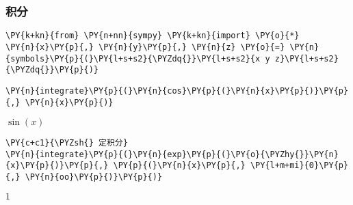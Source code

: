     \hypertarget{ux79efux5206}{%
\subsubsection{积分}\label{ux79efux5206}}

    \begin{tcolorbox}[breakable, size=fbox, boxrule=1pt, pad at break*=1mm,colback=cellbackground, colframe=cellborder]
\begin{Verbatim}[commandchars=\\\{\}]
\PY{k+kn}{from} \PY{n+nn}{sympy} \PY{k+kn}{import} \PY{o}{*}
\PY{n}{x}\PY{p}{,} \PY{n}{y}\PY{p}{,} \PY{n}{z} \PY{o}{=} \PY{n}{symbols}\PY{p}{(}\PY{l+s+s2}{\PYZdq{}}\PY{l+s+s2}{x y z}\PY{l+s+s2}{\PYZdq{}}\PY{p}{)}
\end{Verbatim}
\end{tcolorbox}

    \begin{tcolorbox}[breakable, size=fbox, boxrule=1pt, pad at break*=1mm,colback=cellbackground, colframe=cellborder]
\begin{Verbatim}[commandchars=\\\{\}]
\PY{n}{integrate}\PY{p}{(}\PY{n}{cos}\PY{p}{(}\PY{n}{x}\PY{p}{)}\PY{p}{,} \PY{n}{x}\PY{p}{)}
\end{Verbatim}
\end{tcolorbox}
 
            
    
    $\displaystyle \sin{\left(x \right)}$

    

    \begin{tcolorbox}[breakable, size=fbox, boxrule=1pt, pad at break*=1mm,colback=cellbackground, colframe=cellborder]
\begin{Verbatim}[commandchars=\\\{\}]
\PY{c+c1}{\PYZsh{} 定积分}
\PY{n}{integrate}\PY{p}{(}\PY{n}{exp}\PY{p}{(}\PY{o}{\PYZhy{}}\PY{n}{x}\PY{p}{)}\PY{p}{,} \PY{p}{(}\PY{n}{x}\PY{p}{,} \PY{l+m+mi}{0}\PY{p}{,} \PY{n}{oo}\PY{p}{)}\PY{p}{)}
\end{Verbatim}
\end{tcolorbox}
 
            
    
    $\displaystyle 1$

    

